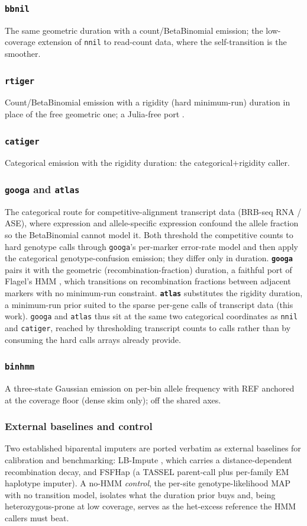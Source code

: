 \documentclass[9pt,twocolumn,twoside]{rilabRxiv}
\newcommand{\nnil}{\texttt{nnil}\xspace}
\newcommand{\bbnil}{\texttt{bbnil}\xspace}
\newcommand{\catiger}{\texttt{catiger}\xspace}
\newcommand{\rtiger}{\texttt{rtiger}\xspace}
\newcommand{\googa}{\texttt{googa}\xspace}
\newcommand{\atlas}{\texttt{atlas}\xspace}
\newcommand{\binhmm}{\texttt{binhmm}\xspace}
\begin{document}
\subsubsection{\bbnil} The same geometric duration with a count/BetaBinomial
emission; the low-coverage extension of \nnil to read-count data, where the
self-transition is the smoother.
\subsubsection{\rtiger} Count/BetaBinomial emission with a rigidity (hard
minimum-run) duration in place of the free geometric one; a Julia-free port
\citep{rtiger_2023}.
\subsubsection{\catiger} Categorical emission with the rigidity duration: the
categorical$+$rigidity caller.
\subsubsection{\googa and \atlas} The categorical route for competitive-alignment
transcript data (BRB-seq RNA / ASE), where expression and allele-specific expression
confound the allele fraction so the BetaBinomial cannot model it. Both threshold the
competitive counts to hard genotype calls through \googa's per-marker error-rate model
and then apply the categorical genotype-confusion emission; they differ only in
duration. \textbf{\googa} pairs it with the geometric (recombination-fraction) duration,
a faithful port of Flagel's HMM \citep{flagel2019,veltsos2024}, which transitions
on recombination fractions between adjacent markers with no minimum-run constraint.
\textbf{\atlas} substitutes the rigidity duration, a minimum-run prior suited to the
sparse per-gene calls of transcript data (this work). \googa and \atlas thus sit at the
same two categorical coordinates as \nnil and \catiger, reached by thresholding transcript
counts to calls rather than by consuming the hard calls arrays already provide.
\subsubsection{\binhmm} A three-state Gaussian emission on per-bin allele frequency
with REF anchored at the coverage floor (dense skim only); off the shared axes.
\subsubsection{External baselines and control} Two established biparental imputers
are ported verbatim as external baselines for calibration and benchmarking:
LB-Impute \citep{lbimpute_2016}, which carries a distance-dependent recombination
decay, and FSFHap (a TASSEL parent-call plus per-family EM haplotype imputer). A
no-HMM \emph{control}, the per-site genotype-likelihood MAP with no transition
model, isolates what the duration prior buys and, being heterozygous-prone at low
coverage, serves as the het-excess reference the HMM callers must beat.
\end{document}
